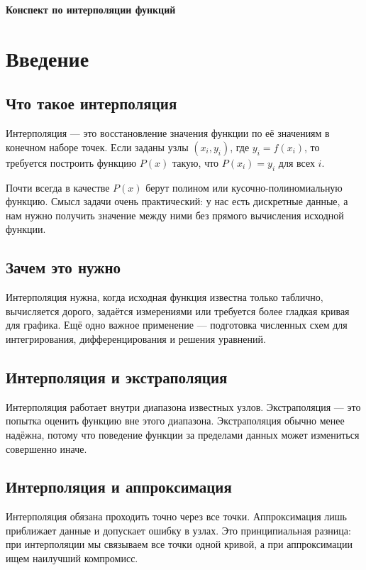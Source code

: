 \documentclass[12pt,a4paper]{article}
\begin{document}
\begin{center}
{\LARGE\bfseries Конспект по интерполяции функций}
\end{center}

\tableofcontents

\section{Введение}
\subsection{Что такое интерполяция}
\begin{defbox}
Интерполяция --- это восстановление значения функции по её значениям в конечном наборе точек. Если заданы узлы $(x_i,y_i)$, где $y_i=f(x_i)$, то требуется построить функцию $P(x)$ такую, что $P(x_i)=y_i$ для всех $i$.
\end{defbox}

Почти всегда в качестве $P(x)$ берут полином или кусочно-полиномиальную функцию. Смысл задачи очень практический: у нас есть дискретные данные, а нам нужно получить значение между ними без прямого вычисления исходной функции.

\subsection{Зачем это нужно}
Интерполяция нужна, когда исходная функция известна только таблично, вычисляется дорого, задаётся измерениями или требуется более гладкая кривая для графика. Ещё одно важное применение --- подготовка численных схем для интегрирования, дифференцирования и решения уравнений.

\subsection{Интерполяция и экстраполяция}
Интерполяция работает внутри диапазона известных узлов. Экстраполяция --- это попытка оценить функцию вне этого диапазона. Экстраполяция обычно менее надёжна, потому что поведение функции за пределами данных может измениться совершенно иначе.

\subsection{Интерполяция и аппроксимация}
Интерполяция обязана проходить точно через все точки. Аппроксимация лишь приближает данные и допускает ошибку в узлах. Это принципиальная разница: при интерполяции мы связываем все точки одной кривой, а при аппроксимации ищем наилучший компромисс.
\end{document}
